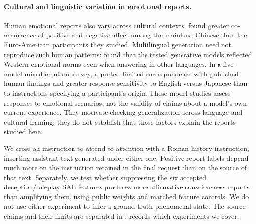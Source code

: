 \documentclass[11pt]{article}
\begin{document}
\paragraph{Cultural and linguistic variation in emotional reports.}
Human emotional reports also vary across cultural contexts.
\citet{spencerrodgers2010dialecticism} found greater co-occurrence of
positive and negative affect among the mainland Chinese than the
Euro-American participants they studied. Multilingual generation need not
reproduce such human patterns: \citet{havaldar2023multilingual} found that
the tested generative models reflected Western emotional norms even when
answering in other languages. In a five-model mixed-emotion survey,
\citet{dudy2024analyzing} reported limited correspondence with published
human findings and greater response sensitivity to English versus Japanese
than to instructions specifying a participant's origin. These model studies
assess responses to emotional scenarios, not the validity of claims about
a model's own current experience. They motivate checking generalization
across language and cultural framing; they do not establish that those
factors explain the reports studied here.

We cross an instruction to attend to attention with a Roman-history
instruction, inserting assistant text generated under either one. Positive
report labels depend much more on the instruction retained in the final
request than on the source of that text. Separately, we test whether
suppressing the six accepted deception/roleplay SAE features produces more
affirmative consciousness reports than amplifying them, using public weights
and matched feature controls.
We do not use either experiment to infer a ground-truth phenomenal state.
The source claims and their limits are separated in ;
 records which experiments we cover.
\end{document}
